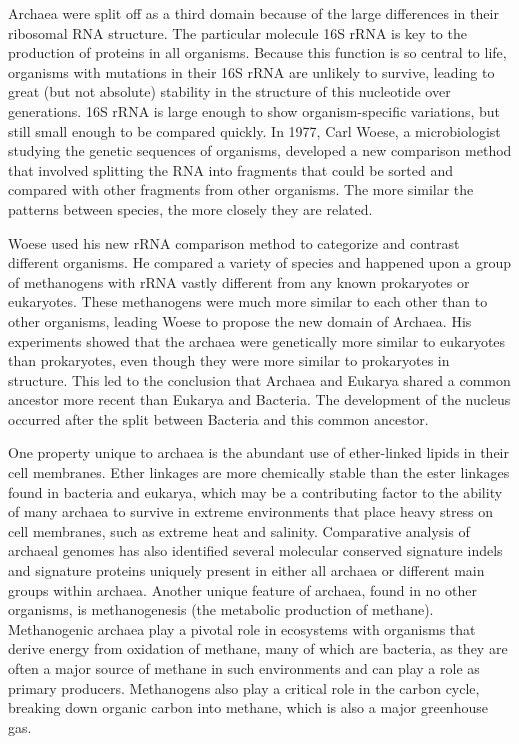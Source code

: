 Archaea were split off as a third domain because of the large differences in their ribosomal RNA structure. The particular molecule 16S rRNA is key to the production of proteins in all organisms. Because this function is so central to life, organisms with mutations in their 16S rRNA are unlikely to survive, leading to great (but not absolute) stability in the structure of this nucleotide over generations. 16S rRNA is large enough to show organism-specific variations, but still small enough to be compared quickly. In 1977, Carl Woese, a microbiologist studying the genetic sequences of organisms, developed a new comparison method that involved splitting the RNA into fragments that could be sorted and compared with other fragments from other organisms. The more similar the patterns between species, the more closely they are related.

Woese used his new rRNA comparison method to categorize and contrast different organisms. He compared a variety of species and happened upon a group of methanogens with rRNA vastly different from any known prokaryotes or eukaryotes. These methanogens were much more similar to each other than to other organisms, leading Woese to propose the new domain of Archaea. His experiments showed that the archaea were genetically more similar to eukaryotes than prokaryotes, even though they were more similar to prokaryotes in structure. This led to the conclusion that Archaea and Eukarya shared a common ancestor more recent than Eukarya and Bacteria. The development of the nucleus occurred after the split between Bacteria and this common ancestor.

One property unique to archaea is the abundant use of ether-linked lipids in their cell membranes. Ether linkages are more chemically stable than the ester linkages found in bacteria and eukarya, which may be a contributing factor to the ability of many archaea to survive in extreme environments that place heavy stress on cell membranes, such as extreme heat and salinity. Comparative analysis of archaeal genomes has also identified several molecular conserved signature indels and signature proteins uniquely present in either all archaea or different main groups within archaea. Another unique feature of archaea, found in no other organisms, is methanogenesis (the metabolic production of methane). Methanogenic archaea play a pivotal role in ecosystems with organisms that derive energy from oxidation of methane, many of which are bacteria, as they are often a major source of methane in such environments and can play a role as primary producers. Methanogens also play a critical role in the carbon cycle, breaking down organic carbon into methane, which is also a major greenhouse gas.

